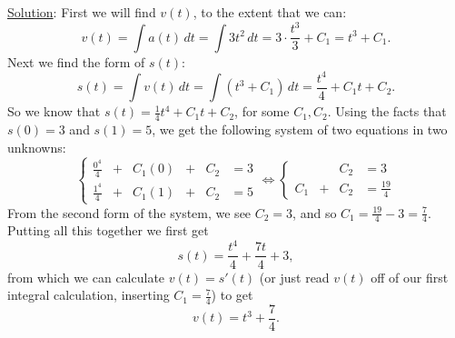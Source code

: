 \underline{Solution}:
First we will find $v(t)$, to the extent that we can:
$$v(t)=\int a(t)\,dt=\int 3t^2\,dt =3\cdot\frac{t^3}{3}+C_1=t^3+C_1.$$
Next we find the form of $s(t)$:
$$s(t)=\int v(t)\,dt=\int\left(t^3+C_1\right)\,dt=\frac{t^4}4+C_1t+C_2.$$
So we know that $s(t)=\frac14t^4+C_1t+C_2$, for some $C_1,C_2$.
Using the facts that $s(0)=3$ and $s(1)=5$, we get the
following system of two equations in two unknowns:
$$\left\{\begin{array}{rcrcrcr}
\frac{0^4}4&+&C_1(0)&+&C_2&=3\\
\frac{1^4}4&+&C_1(1)&+&C_2&=5
\end{array}\right.
\iff \left\{\begin{array}{rcrcr}&&C_2&=3\\ C_1&+&C_2&=\frac{19}4
\end{array}\right.
$$
From the second form of the system, we see $C_2=3$,
 and so $C_1=\frac{19}4-3=\frac{7}4$.  
Putting all this together we first get
$$s(t)=\frac{t^4}4+\frac{7t}4+3,$$
from which we can calculate $v(t)=s'(t)$ (or just read $v(t)$
off of our first integral calculation, inserting $C_1=\frac74$) to get
$$v(t)=t^3+\frac74.$$ 
\eex 
